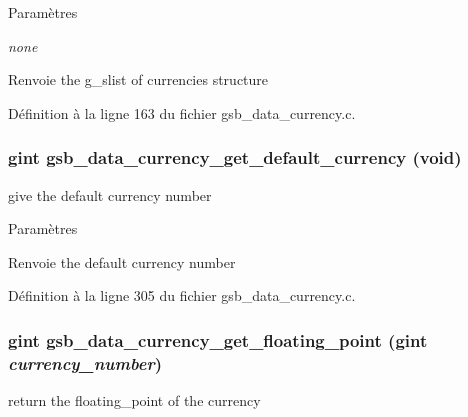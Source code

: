 \begin{DoxyParams}{Paramètres}
\item[{\em none}]\end{DoxyParams}
\begin{DoxyReturn}{Renvoie}
the g\_\-slist of currencies structure 
\end{DoxyReturn}


Définition à la ligne 163 du fichier gsb\_\-data\_\-currency.c.

\subsubsection[{gsb\_\-data\_\-currency\_\-get\_\-default\_\-currency}]{\setlength{\rightskip}{0pt plus 5cm}gint gsb\_\-data\_\-currency\_\-get\_\-default\_\-currency (void)}\label{gsb__data__currency_8c_a8f8303b11d4aa9962d2dfd5d8c4962cb}
give the default currency number


\begin{DoxyParams}{Paramètres}
\item[{\em }]\end{DoxyParams}
\begin{DoxyReturn}{Renvoie}
the default currency number 
\end{DoxyReturn}


Définition à la ligne 305 du fichier gsb\_\-data\_\-currency.c.

\subsubsection[{gsb\_\-data\_\-currency\_\-get\_\-floating\_\-point}]{\setlength{\rightskip}{0pt plus 5cm}gint gsb\_\-data\_\-currency\_\-get\_\-floating\_\-point (gint {\em currency\_\-number})}\label{gsb__data__currency_8c_ae61136d9086c83d0fc0c8ea42e463c11}
return the floating\_\-point of the currency



